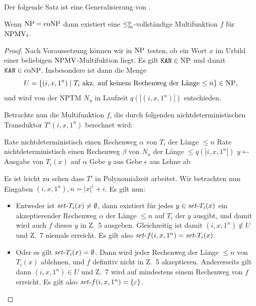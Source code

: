 Der folgende Satz ist eine Generalisierung von \textcite{dingel_separation_2022}.
\begin{theorem}\label{thm:npmvt-vs-npconp}
    Wenn $\mathrm{NP}=\mathrm{coNP}$ dann existiert eine $\leq_\mathrm{m}^\mathrm{p}$-vollständige Multifunktion $f$ für $\mathrm{NPMV}_t$.
\end{theorem}
\begin{proof}
    Nach Voraussetzung können wir in $\mathrm{NP}$ testen, ob ein Wort $x$ im Urbild einer beliebigen $\mathrm{NPMV}$-Multifuktion liegt.
    Es gilt $\mathtt{KAN}\in\mathrm{NP}$ und damit $\mathtt{KAN}\in\mathrm{coNP}$. Insbesondere ist dann die Menge
    \[ U = \{ (i, x, 1^n) \mid T_i \text{ akz. auf keinem Rechenweg der Länge $\leq n$} \} \in\mathrm{NP},  \]
    und wird von der NPTM $N_u$ in Laufzeit $q(|(i, x, 1^n)|)$ entschieden.

    Betrachte nun die Multifunktion $f$, die durch folgenden nichtdeterministischen Transduktor $T'(i, x, 1^n)$ berechnet wird:\\
    \begin{algorithm}[H]
        Rate nichtdeterministisch einen Rechenweg $\alpha$ von $T_i$ der Länge $\leq n$\;
        Rate nichtdeterministisch einen Rechenweg $\beta$ von $N_u$ der Länge $\leq q(|i, x, 1^n|)$\;
        {
            $y\gets $ Ausgabe von $T_i(x)$ auf $\alpha$\;
            Gebe $y$ aus\;
        }
        {
            Gebe $\epsilon$ aus\;
        }
        \Else
        {
            Lehne ab\;
        }
    \end{algorithm}
    Es ist leicht zu sehen dass $T'$ in Polynomialzeit arbeitet. Wir betrachten nun Eingaben $(i, x, 1^n), n={|x|^i+i}$. Es gilt nun:
    \begin{itemize}[nosep]
        \item Entweder ist $\mathit{set}\text{-}{T_i}(x)\neq \emptyset$, dann existiert für jedes $y\in \mathit{set}\text{-}{T_i}(x)$ ein akzeptierender Rechenweg $\alpha$ der Länge $\leq n$ auf $T_i$ der $y$ ausgibt, und damit wird auch $f$ dieses $y$ in Z.~5 ausgeben.
            Gleichzeitig ist damit $(i, x, 1^n)\not\in U$ und Z.~7 niemals erreicht.
            Es gilt also $\mathit{set}\text{-}{f}(i, x, 1^n)=\mathit{set}\text{-}{T_i}(x)$.
        \item Oder es gilt $\mathit{set}\text{-}{T_i}(x)=\emptyset$.
            Dann wird jeder Rechenweg der Länge $\leq n$ von $T_i(x)$ ablehnen, und $f$ definitiv nicht in Z.~5 akzeptieren.
            Andererseits gilt dann $(i, x, 1^n)\in U$ und Z.~7 wird auf mindestens einem Rechenweg von $f$ erreicht.
            Es gilt also $\mathit{set}\text{-}{f}(i, x, 1^n)=\{\varepsilon\}$.
    \end{itemize}


\end{proof}
